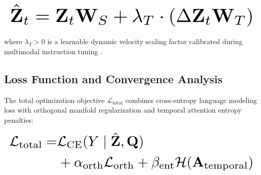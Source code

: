 \documentclass{article}
\begin{document}
\begin{equation}
\resizebox{\columnwidth}{!}{$\displaystyle
\begin{aligned}
\hat{\mathbf{Z}}_t = \mathbf{Z}_t \mathbf{W}_S + \lambda_T \cdot \left( \Delta \mathbf{Z}_t \mathbf{W}_T \right)
\end{aligned}
$}
\end{equation}

























where $\lambda_T > 0$ is a learnable dynamic velocity scaling factor calibrated during multimodal instruction tuning \cite{arxiv_2305_18290}.




\subsection{Loss Function and Convergence Analysis}


The total optimization objective $\mathcal{L}_{\text{total}}$ combines cross-entropy language modeling loss with orthogonal manifold regularization and temporal attention entropy penalties:

























\begin{equation}
\resizebox{\columnwidth}{!}{$\displaystyle
\begin{aligned}
\mathcal{L}_{\text{total}} = & \mathcal{L}_{\text{CE}}(Y \mid \hat{\mathbf{Z}}, \mathbf{Q}) \\
& + \alpha_{\text{orth}} \mathcal{L}_{\text{orth}} + \beta_{\text{ent}} \mathcal{H}(\mathbf{A}_{\text{temporal}})
\end{aligned}
$}
\end{equation}
\end{document}
